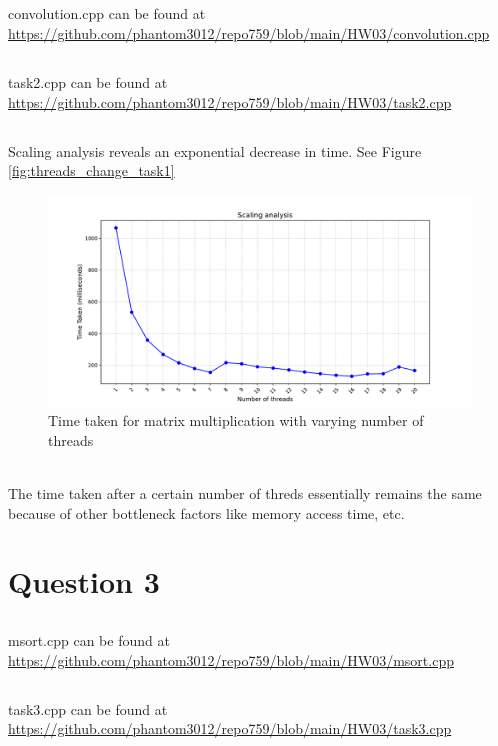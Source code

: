 \documentclass[12pt]{article}
\begin{document}
\subsection{}
convolution.cpp can be found at \url{https://github.com/phantom3012/repo759/blob/main/HW03/convolution.cpp}
\subsection{}
task2.cpp can be found at \url{https://github.com/phantom3012/repo759/blob/main/HW03/task2.cpp}
\subsection{}
Scaling analysis reveals an exponential decrease in time. See Figure \ref{fig:threads_change_task1}
\begin{figure}[ht]
    \includegraphics[width = \textwidth]{task2.pdf}
    \caption{Time taken for matrix multiplication with varying number of threads}
    \label{fig:threads_change_task2}
\end{figure}
\\The time taken after a certain number of threds essentially remains the same because of other bottleneck factors like memory access time, etc.

\section{Question 3}
\subsection{}
msort.cpp can be found at \url{https://github.com/phantom3012/repo759/blob/main/HW03/msort.cpp}
\subsection{}
task3.cpp can be found at \url{https://github.com/phantom3012/repo759/blob/main/HW03/task3.cpp}
\newpage
\end{document}
